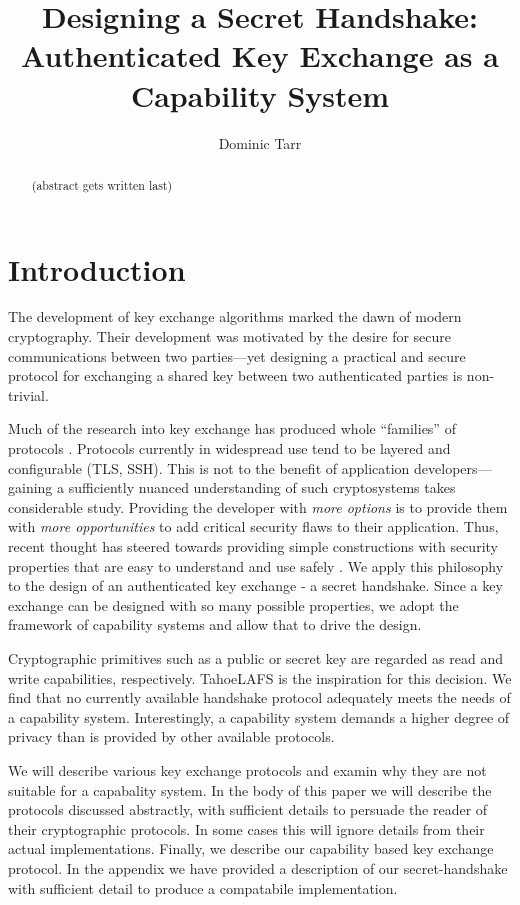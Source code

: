 \documentclass[12pt]{article}
\begin{document}
\title{Designing a Secret Handshake: Authenticated Key Exchange as a Capability System}
\author{Dominic Tarr}


\maketitle

\begin{abstract}
  (abstract gets written last)
\end{abstract}

\section{Introduction}

The development of key exchange algorithms marked the dawn of
modern cryptography\cite{ndic}. Their development was motivated
by the desire for secure communications between two parties---yet
designing a practical and secure protocol for exchanging
a shared key between two authenticated parties is non-trivial\cite{aake}.

Much of the research into key exchange has produced whole ``families'' of
protocols \cite{sigma}. Protocols currently in widespread
use tend to be layered and configurable (TLS, SSH). This is not
to the benefit of application developers---gaining a sufficiently
nuanced understanding of such cryptosystems takes considerable study.
Providing the developer with \emph{more options} is to provide them
with \emph{more opportunities} to add critical security flaws to their
application. Thus, recent thought has steered towards providing simple constructions
with security properties that are easy to understand and use safely
\cite{nacl}. We apply this philosophy to the design of an authenticated
key exchange - a secret handshake. Since a key exchange can be designed
with so many possible properties, we adopt the framework of capability
systems\cite{unicap} and allow that to drive the design.

Cryptographic primitives such as a public or secret key are regarded
as read and write capabilities, respectively. TahoeLAFS\cite{tahoe} is
the inspiration for this decision. We find that no currently available
handshake protocol adequately meets the needs of a capability
system.
Interestingly, a capability system demands a higher degree
of privacy than is provided by other available protocols.

We will describe various key exchange protocols and examin why they
are not suitable for a capabality system. In the body of this paper
we will describe the protocols discussed abstractly, with sufficient
details to persuade the reader of their cryptographic protocols.
In some cases this will ignore details from their actual implementations.
Finally, we describe our capability based key exchange protocol.
In the appendix we have provided a description of our secret-handshake
with sufficient detail to produce a compatabile implementation.
\end{document}
